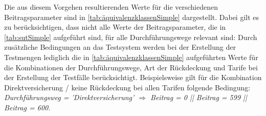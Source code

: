 Die aus diesem Vorgehen resultierenden Werte für die verschiedenen Beitragsparameter sind in \autoref{tab:äquivalenzklassenSimple} dargestellt. Dabei gilt es zu berücksichtigen, dass nicht alle Werte der Beitragsparameter, die in \autoref{tab:sutSimple} aufgeführt sind, für alle Durchführungswege relevant sind: Durch zusätzliche Bedingungen an das Testsystem werden bei der Erstellung der Testmengen lediglich die in \autoref{tab:äquivalenzklassenSimple} aufgeführten Werte für die Kombinationen der Durchführungswege, Art der Rückdeckung und Tarife bei der Erstellung der Testfälle berücksichtigt. Beispielsweise gilt für die Kombination Direktversicherung / keine Rückdeckung bei allen Tarifen folgende Bedingung: \textit{Durchführungsweg = 'Direktversicherung' $\Rightarrow$ Beitrag = 0 || Beitrag = 599 || Beitrag = 600.}


\renewcommand{\arraystretch}{2.5}

